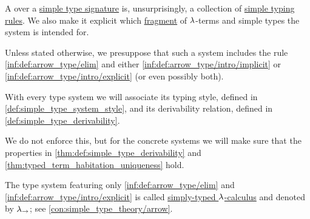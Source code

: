 \begin{definition}\label{def:simple_type_system}\mimprovised
  A  over a \hyperref[def:simple_type_signature]{simple type signature} is, unsurprisingly, a collection of \hyperref[def:simple_typing_rule]{simple typing rules}. We also make it explicit which \hyperref[con:syntax_fragment]{fragment} of \( {\mathrm \lambda} \)-terms and simple types the system is intended for.

  Unless stated otherwise, we presuppose that such a system includes the rule \ref{inf:def:arrow_type/elim} and either \ref{inf:def:arrow_type/intro/implicit} or \ref{inf:def:arrow_type/intro/explicit} (or even possibly both).
\end{definition}
\begin{comments}
  \item With every type system we will associate its typing style, defined in \cref{def:simple_type_system_style}, and its derivability relation, defined in \cref{def:simple_type_derivability}.

  \item We do not enforce this, but for the concrete systems we will make sure that the properties in \cref{thm:def:simple_type_derivability} and \cref{thm:typed_term_habitation_uniqueness} hold.

  \item The type system featuring only \ref{inf:def:arrow_type/elim} and \ref{inf:def:arrow_type/intro/explicit} is called \hyperref[con:simple_type_theory/arrow]{simply-typed \( {\mathrm \lambda} \)-calculus} and denoted by \( {\mathrm \lambda}_{\rightarrow} \); see \cref{con:simple_type_theory/arrow}.
\end{comments}

